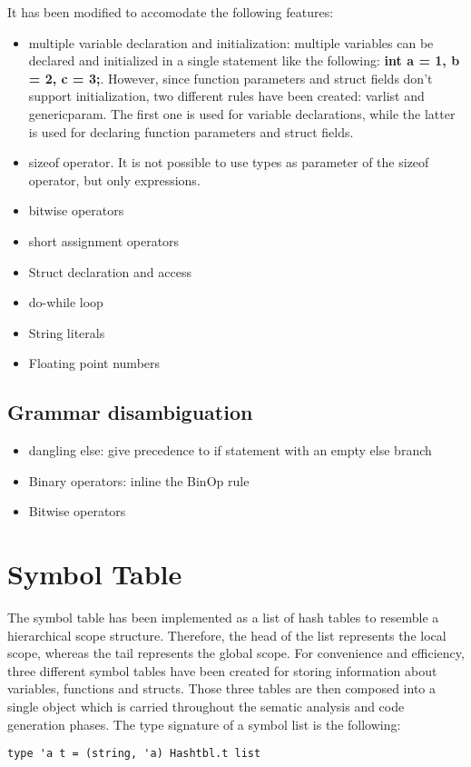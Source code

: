 \documentclass{article}
\begin{document}
It has been modified to accomodate the following features:
\begin{itemize}
    \item multiple variable declaration and initialization: multiple variables can be declared and initialized in a single statement
    like the following: \textbf{int a = 1, b = 2, c = 3;}. However, since function parameters and struct fields don't support initialization,
    two different rules have been created: varlist and genericparam. The first one is used for variable declarations,
    while the latter is used for declaring function parameters and struct fields.
    \item sizeof operator. It is not possible to use types as parameter of the sizeof operator, but only expressions.
    \item bitwise operators
    \item short assignment operators
    \item Struct declaration and access
    \item do-while loop
    \item String literals
    \item Floating point numbers
\end{itemize}
\subsection*{Grammar disambiguation}
\begin{itemize}
  \item dangling else: give precedence to if statement with an empty else branch
  \item Binary operators: inline the BinOp rule
  \item Bitwise operators
\end{itemize}

\section{Symbol Table}
The symbol table has been implemented as a list of hash tables to resemble a hierarchical scope structure.
Therefore, the head of the list represents the local scope, whereas the tail represents the global scope.
For convenience and efficiency, three different symbol tables have been created for storing information about variables, functions and structs.
Those three tables are then composed into a single object which is carried throughout the sematic analysis and code generation phases.
The type signature of a symbol list is the following:
\begin{lstlisting}
type 'a t = (string, 'a) Hashtbl.t list
\end{lstlisting}
\end{document}
